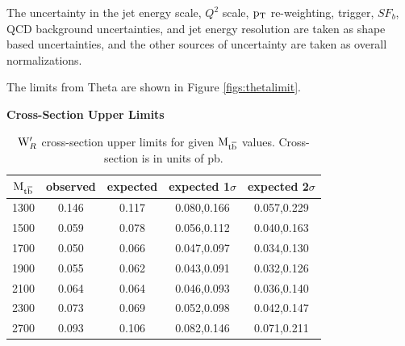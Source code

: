 The uncertainty in the jet energy scale, $Q^2$ scale, $\mathrm{p_{T}}$ re-weighting, trigger, $SF_b$, QCD background uncertainties, and jet energy resolution are taken 
as shape based uncertainties, and the other sources of uncertainty are taken as overall normalizations.  

The limits from Theta are shown in Figure \ref{figs:thetalimit}.

\begin{table}
\begin{center}
\bf{Cross-Section Upper Limits}\\
\begin{tabular}{|c||c|c|c|c|}
\hline
\bf{$\mathrm{M_{{t\overline{b}}}}$} & \bf{observed}  & \bf{expected} & \bf{expected 1$\sigma$}  & \bf{expected 2$\sigma$} \\
\hline
\hline
1300 & 0.146 & 0.117 & 0.080,0.166 & 0.057,0.229\\
\hline
1500 & 0.059 & 0.078 & 0.056,0.112 & 0.040,0.163\\
\hline
1700 & 0.050 & 0.066 & 0.047,0.097 & 0.034,0.130\\
\hline
1900 & 0.055 & 0.062 & 0.043,0.091 & 0.032,0.126\\
\hline
2100 & 0.064 & 0.064 & 0.046,0.093 & 0.036,0.140\\
\hline
2300 & 0.073 & 0.069 & 0.052,0.098 & 0.042,0.147\\
\hline
2700 & 0.093 & 0.106 & 0.082,0.146 & 0.071,0.211\\
\hline
\end{tabular}
\end{center}
\caption{$\mathrm{W}^\prime_R$ cross-section upper limits for given $\mathrm{M_{{t\overline{b}}}}$ values.  Cross-section is in units of pb.}
\label{table:upperxsec}
\end{table}


